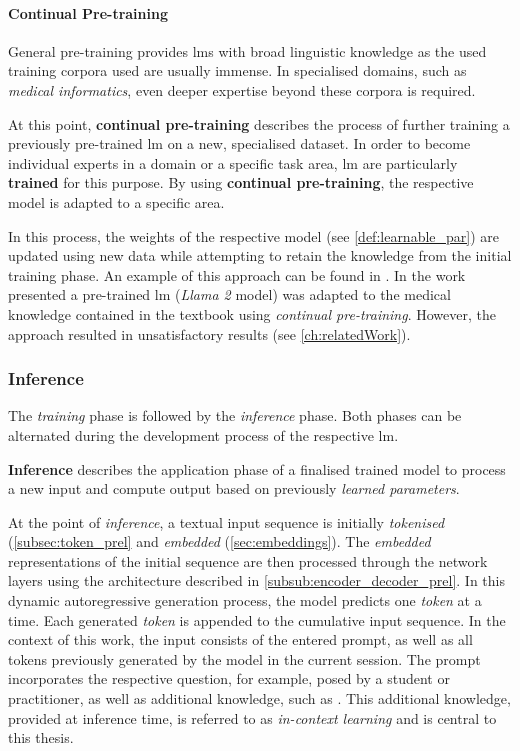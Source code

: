\paragraph{Continual Pre-training}
General pre-training provides \acp{lm} with broad linguistic knowledge as the used training corpora used are usually immense.
In specialised domains, such as \textit{medical informatics}, even deeper expertise beyond these corpora is required. 
\begin{definition}\label{def:continual_pretaining}
At this point, \textbf{continual pre-training} describes the process of further training a previously pre-trained \ac{lm} on a new, specialised dataset.
In order to become individual experts in a domain or a specific task area, \ac{lm} are particularly \textbf{trained} for this purpose.
By using \textbf{continual pre-training}, the respective model is adapted to a specific area.
\end{definition}
In this process, the weights of the respective model (see \cref{def:learnable_par}) are updated using new data while attempting to retain the knowledge from the initial training phase.
An example of this approach can be found in \citet{Paul_Keller}.
In the work presented a pre-trained \ac{lm} (\textit{Llama 2} model) was adapted to the medical knowledge contained in the textbook \citet{bb2} using \textit{continual pre-training}.
However, the approach resulted in unsatisfactory results (see \cref{ch:relatedWork}).
%
\subsubsection{Inference}\label{subsub:inference_prel}
The \textit{training} phase is followed by the \textit{inference} phase.
Both phases can be alternated during the development process of the respective \ac{lm}.
\begin{definition}\label{def:inference}
\textbf{Inference} describes the application phase of a finalised trained model to process a new input and compute output based on previously \textit{learned parameters}.
\end{definition}
%
At the point of \textit{inference}, a textual input sequence is initially \textit{tokenised} (\cref{subsec:token_prel} and \textit{embedded} (\cref{sec:embeddings}).
The \textit{embedded} representations of the initial sequence are then processed through the network layers using the architecture described in \cref{subsub:encoder_decoder_prel}.
In this dynamic autoregressive generation process, the model predicts one \textit{token} at a time.
Each generated \textit{token} is appended to the cumulative input sequence.
In the context of this work, the input consists of the entered prompt, as well as all tokens previously generated by the model in the current session.
The prompt incorporates the respective question, for example, posed by a student or practitioner, as well as additional knowledge, such as \citet{bb2}.
This additional knowledge, provided at inference time, is referred to as \textit{in-context learning} and is central to this thesis.
%
